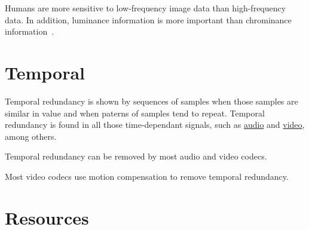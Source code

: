 Humans are more sensitive to low-frequency image data than
high-frequency data. In addition, luminance information is more
important than chrominance information~\cite{kondoz2009visual}.

\section{Temporal}
Temporal redundancy is shown by sequences of samples when those
samples are similar in value and when paterns of samples tend to
repeat. Temporal redundancy is found in all those time-dependant
signals, such as
\href{https://en.wikipedia.org/wiki/Inter_frame}{audio} and
\href{https://en.wikipedia.org/wiki/Inter_frame}{video}, among others.

Temporal redundancy can be removed by most audio and video codecs.

Most video codecs use motion compensation to remove temporal redundancy.

\section{Resources}
\renewcommand{\addcontentsline}[3]{}%


